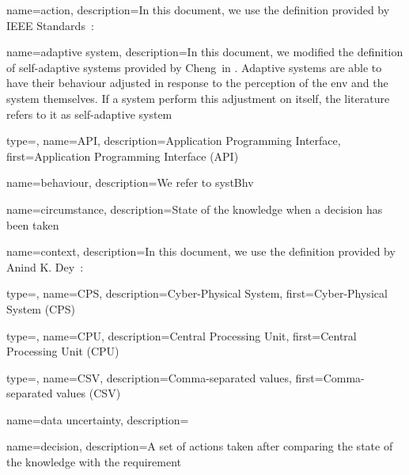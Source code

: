 {
	name={ac\-tion},
	description={In this document, we use the definition provided by IEEE Standards~\cite{iso2017systems}: }
}

{
	name={a\-dap\-tive sys\-tem},
	description={In this document, we modified the definition of self-adaptive systems provided by Cheng~\etal in \cite{DBLP:conf/dagstuhl/ChengLGIMABBBCSDFGGGKKKLMMMPSTTWW09}. Adaptive systems are able to have their \gls{behaviour} adjusted in response to the perception of the \gls{env} and the system themselves. If a system perform this adjustment on itself, the literature refers to it as self-adaptive system}
}

{
	type=\acronymtype,
	name={API},
	description={Application Programming Interface},
	first={Application Programming Interface (API)}
}

{
	name={be\-ha\-viour},
	description={We refer to \gls{systBhv}}
}

{
	name={cir\-cums\-tance},
	description={State of the \gls{knowledge} when a \gls{decision} has been taken}
}

{
	name={con\-text},
	description={In this document, we use the definition provided by Anind K. Dey~\cite{DBLP:journals/puc/Dey01}: }
}

{
	type=\acronymtype,
	name={CPS},
	description={Cyber-Physical System},
	first={Cyber-Physical System (CPS)}
}

{
	type=\acronymtype,
	name={CPU},
	description={Central Processing Unit},
	first={Central Processing Unit (CPU)}
}

{
	type=\acronymtype,
	name={CSV},
	description={Comma-separated values},
	first={Comma-separated values (CSV)}
}

{
	name={data uncertainty},
	description={}
}

{
	name={de\-ci\-sion},
	description={A set of \glspl{action} taken after comparing the state of the \gls{knowledge} with the \gls{requirement}}
}

